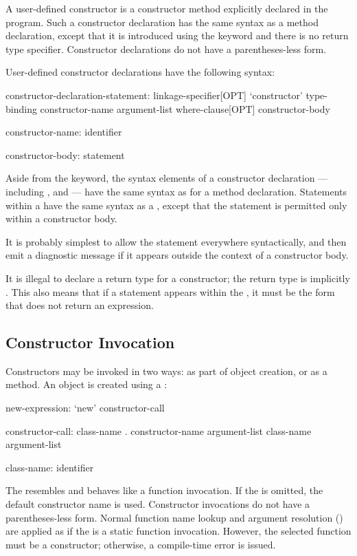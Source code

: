 A user-defined constructor is a constructor method explicitly declared
in the program.  Such a constructor declaration has the same
syntax as a method declaration, except that it is introduced using
the  keyword and there is no return type specifier.
Constructor declarations do not have a parentheses-less form.

User-defined constructor declarations have the following syntax:
\begin{syntax}
constructor-declaration-statement:
  linkage-specifier[OPT] `constructor' type-binding constructor-name argument-list 
    where-clause[OPT] constructor-body

constructor-name:
  identifier

constructor-body:
  statement
\end{syntax}

Aside from the  keyword, the syntax elements of a constructor
declaration --- including  , 
and  ---  have the same syntax as for a method declaration.
Statements within a  have the same syntax as
a , except that the  statement is permitted only
within a constructor body.

\begin{note}
It is probably simplest to allow the  statement everywhere
syntactically, and then emit a diagnostic message if it appears outside the
context of a constructor body.
\end{note}

It is illegal to declare a return type for a constructor; the return type is
implicitly .  This also means that if a  statement
appears within the , it must be the form that does not
return an expression.

\subsection{Constructor Invocation}
\label{Constructor_Invocation}

Constructors may be invoked in two ways: as part of object creation, or as
a method.  An object is created using a :
\begin{syntax}
new-expression:
  `new' constructor-call

constructor-call:
  class-name . constructor-name argument-list
  class-name argument-list

class-name:
  identifier
\end{syntax}
\noindent
The  resembles and behaves like a function invocation.
If the  is omitted, the default constructor
name  is used.  Constructor invocations do not have a
parentheses-less form.  Normal function name lookup and argument resolution
() are applied as if the  is a
static function invocation.  However, the selected function must be a
constructor; otherwise, a compile-time error is issued.

